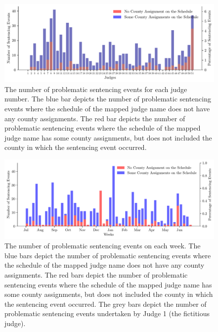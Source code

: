 \documentclass[11pt, oneside]{article}   	%
\theoremstyle{ModifiedStyle}
\begin{document}
%
\begin{figure}[h!]
	\centering
	\includegraphics[scale=0.75]{Figures/Mapping_Judge_Numbers_To_Judge_Names_Judge_Distribution}
	\vspace{-2mm}
	\caption{The number of problematic sentencing events for each judge number. The blue bar depicts the number of problematic sentencing events where the schedule of the mapped judge name does not have any county assignments. The red bar depicts the number of problematic sentencing events where the schedule of the mapped judge name has some county assignments, but does not included the county in which the sentencing event occurred.}
	\label{Figure_Mapping_Problematic_Sentencing_Events_Judge_Distribution}
\end{figure}
%
\begin{figure}[h!]
	\centering
	\includegraphics[scale=0.75]{Figures/Mapping_Judge_Numbers_To_Judge_Names_Week_Distribution}
	\vspace{-2mm}
	\caption{The number of problematic sentencing events on each week. The blue bars depict the number of problematic sentencing events where the schedule of the mapped judge name does not have any county assignments. The red bars depict the number of problematic sentencing events where the schedule of the mapped judge name has some county assignments, but does not included the county in which the sentencing event occurred. The grey bars depict the number of problematic sentencing events undertaken by Judge 1 (the fictitious judge).}
	\label{Figure_Mapping_Problematic_Sentencing_Events_Week_Distribution}
\end{figure}
\end{document}
